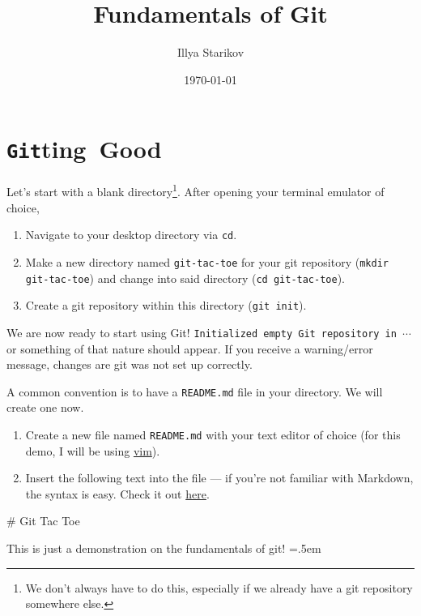 \documentclass[12pt]{article}
\title{Fundamentals of Git}
\date{\today}
\author{Illya Starikov}
\newenvironment{lcverbatim}
 {\SaveVerbatim{cverb}}
 {\endSaveVerbatim
  \flushleft\fboxrule=0pt\fboxsep=.5em
  \scriptsize
  \colorbox{cverbbg}{%
    \makebox[\dimexpr\linewidth-2\fboxsep][l]{\BUseVerbatim{cverb}}%
  }
  \endflushleft
}
\newcommand{\shellcmd}[1]{\texttt{\colorbox{gray!30}{#1}}}
\begin{document}
\maketitle


\section{\texorpdfstring{\shellcmd{Git}ting} \ \ Good}
Let's start with a blank directory\footnote{We don't always have to do this, especially if we already have a git repository somewhere else.}. After opening your terminal emulator of choice,

\begin{enumerate}
    \item Navigate to your desktop directory via \shellcmd{cd}.
    \item Make a new directory named \texttt{git-tac-toe} for your git repository (\shellcmd{mkdir git-tac-toe}) and change into said directory (\shellcmd{cd git-tac-toe}).
    \item Create a git repository within this directory (\shellcmd{git init}).
\end{enumerate}

\noindent We are now ready to start using Git! \texttt{Initialized empty Git repository in $\cdots$} or something of that nature should appear. If you receive a warning/error message, changes are git was not set up correctly.

A common convention is to have a \texttt{README.md} file in your directory. We will create one now.

\begin{enumerate}
    \item Create a new file named \texttt{README.md} with your text editor of choice (for this demo, I will be using \href{http://www.vim.org}{vim}).
    \item Insert the following text into the file --- if you're not familiar with Markdown, the syntax is easy. Check it out \href{https://guides.github.com/features/mastering-markdown/}{here}.
\end{enumerate}

\begin{lcverbatim}
# Git Tac Toe

This is just a demonstration on the fundamentals of git!
\end{lcverbatim}
\end{document}
